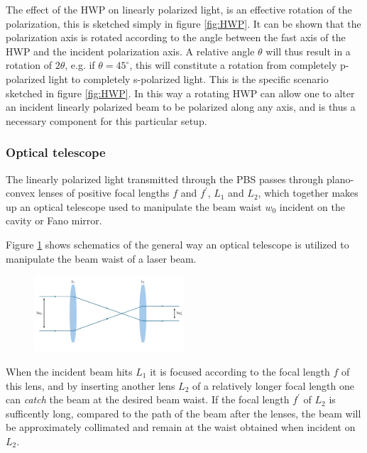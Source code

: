 The effect of the HWP on linearly polarized light, is an effective rotation of the polarization, this is sketched simply in figure \ref{fig:HWP}. It can be shown that the polarization axis is rotated according to the angle between the fast axis of the HWP and the incident polarization axis. A relative angle $\theta$ will thus result in a rotation of $2\theta$, e.g. if $\theta=45^{\circ}$, this will constitute a rotation from completely p-polarized light to completely s-polarized light. This is the specific scenario sketched in figure \ref{fig:HWP}\cite{edmund_optics}. In this way a rotating HWP can allow one to alter an incident linearly polarized beam to be polarized along any axis, and is thus a necessary component for this particular setup.

\subsubsection{Optical telescope}

The linearly polarized light transmitted through the PBS passes through plano-convex lenses of positive focal lengths $f$ and $f^{\prime}$, $L_1$ and $L_2$, which together makes up an optical telescope used to manipulate the beam waist $w_0$ incident on the cavity or Fano mirror. 

Figure \ref{fig:telescope} shows schematics of the general way an optical telescope is utilized to manipulate the beam waist of a laser beam.

\begin{figure}[h!]
    \centering
    \includegraphics[width=0.5\textwidth]{figures/optical_telescope.pdf}
    \caption{}
    \label{fig:telescope}
\end{figure}

When the incident beam hits $L_1$ it is focused according to the focal length $f$ of this lens, and by inserting another lens $L_2$ of a relatively longer focal length one can \emph{catch} the beam at the desired beam waist. If the focal length $f^{\prime}$ of $L_2$ is sufficently long, compared to the path of the beam after the lenses, the beam will be approximately collimated and remain at the waist obtained when incident on $L_2$.

